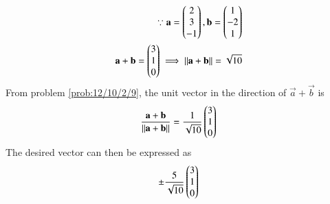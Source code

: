 \begin{align}
\because     \Vec{a}=\myvec{
        2\\3\\-1
    },\Vec{b}=\myvec{
        1\\-2\\1
    }\\
	\vec{a}+\vec{b}=\myvec{
        3\\1\\0
    }
    \implies
	\norm{\vec{a}+\vec{b}}=\sqrt{10}
\end{align}
From problem
        \ref{prob:12/10/2/9},
the unit vector in the direction of 
${\vec{a}+\vec{b}}$
is
\begin{align}
	\frac{{\mathbf{a}+\mathbf{b}}}{\left\lVert\mathbf{a}+\mathbf{b}\right\rVert}
=\frac{1}{\sqrt{10}}\begin{pmatrix}
        3\\1\\0
    \end{pmatrix}
\end{align}
The desired vector can then be expressed as
\begin{align}
\pm\frac{5}{\sqrt{10}}\begin{pmatrix}
        3\\1\\0
    \end{pmatrix}
\end{align}

